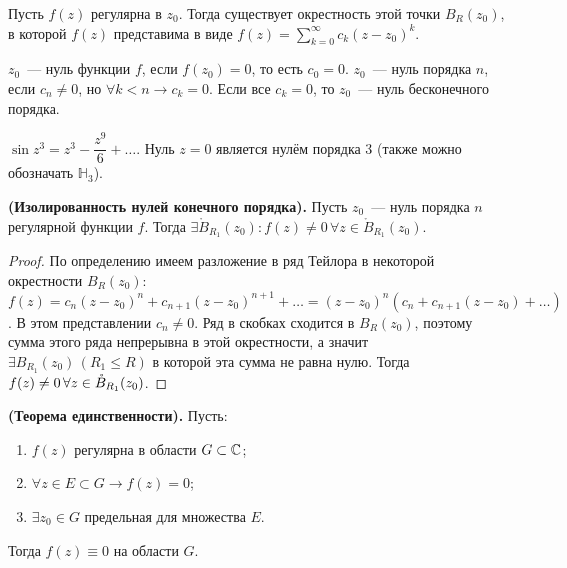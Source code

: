 
Пусть \(f(z)\) регулярна в \(z_0\). Тогда существует окрестность этой точки \(B_R(z_0)\), в которой
\(f(z)\) представима в виде \(f(z) = \sum\limits_{k = 0}^\infty c_k (z-z_0)^k\).

\begin{definition}
    \(z_0\)~--- нуль функции \(f\), если \(f(z_0) = 0\), то есть \(c_0 = 0\). \(z_0\)~--- нуль
    порядка \(n\), если \(c_n \ne 0\), но \(\forall k < n \rightarrow c_k = 0\). Если все
    \(c_k = 0\), то \(z_0\)~--- нуль бесконечного порядка.
\end{definition}

\begin{example}
    \(\sin{z^3} = z^3 - \dfrac{z^9}{6} + \dots\). Нуль \(z = 0\) является нулём порядка 3 (также
    можно обозначать \(\mathbb{H}_3\)).
\end{example}

\begin{statement}\label{20:isolated_zeros}
    \textbf{(Изолированность нулей конечного порядка).} Пусть \(z_0\)~--- нуль порядка \(n\)
    регулярной функции \(f\). Тогда \(\exists \mathring{B}_{R_1}(z_0)\colon f(z) \ne 0 \, \forall z
    \in \mathring{B}_{R_1}(z_0)\).
\end{statement}

\begin{proof}
    По определению имеем разложение в ряд Тейлора в некоторой окрестности \(B_R(z_0)\): \(f(z) =
    c_n(z-z_0)^n + c_{n+1}(z-z_0)^{n+1} + \dots = (z-z_0)^n(c_n + c_{n+1} (z-z_0) + \dots)\). В этом
    представлении \(c_n \ne 0\). Ряд в скобках сходится в \(B_R(z_0)\), поэтому сумма этого ряда
    непрерывна в этой окрестности, а значит \(\exists B_{R_1}(z_0) \, (R_1 \le R)\) в которой эта
    сумма не равна нулю. Тогда \(f(z) \hm\ne 0 \, \forall z \in \mathring{B}_{R_1}(z_0)\).
\end{proof}

\begin{statement}
    \textbf{(Теорема единственности).} Пусть:
    \begin{enumerate}[wide=20pt, label=\arabic*., itemsep=0ex]
        \item \(f(z)\) регулярна в области \(G \subset \mathbb{C}\);
        \item \(\forall z \in E \subset G \rightarrow f(z) = 0\);
        \item \(\exists z_0 \in G\) предельная для множества \(E\).
    \end{enumerate}
    Тогда \(f(z) \equiv 0\) на области \(G\).
\end{statement}

